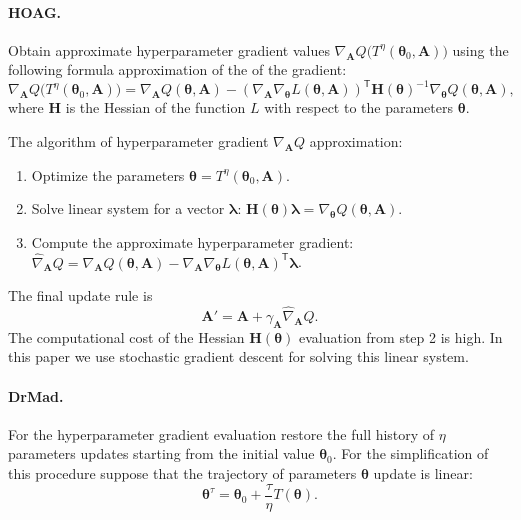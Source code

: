 \documentclass[smallcondensed]{svjour3}
\begin{document}
\paragraph{HOAG.}
Obtain approximate hyperparameter gradient values  $\nabla_{\mathbf{A}} Q \bigl(T^\eta(\boldsymbol{\theta}_0, \mathbf{A})\bigr)$ using the following  formula approximation of the  of the gradient:
\[
\nabla_{\mathbf{A}} Q \bigl(T^\eta(\boldsymbol{\theta}_0, \mathbf{A})\bigr) = \nabla_{\mathbf{A}} Q(\boldsymbol{\theta}, \mathbf{A}) - (\nabla_{ \mathbf{A}}  \nabla_{\boldsymbol{\theta}} L(\boldsymbol{\theta}, \mathbf{A}))^\mathsf{T}\mathbf{H}(\boldsymbol{\theta})^{-1}\nabla_{\boldsymbol{\theta}} Q(\boldsymbol{\theta}, \mathbf{A}),
\]
where $\mathbf{H}$ is the Hessian of the function $L$ with respect to the parameters $\boldsymbol{\theta}$.

The algorithm of hyperparameter gradient $\nabla_{\mathbf{A}} Q$  approximation:
\begin{enumerate}
\item Optimize the parameters $\boldsymbol{\theta} = T^\eta(\boldsymbol{\theta}_0, \mathbf{A})$.
\item Solve linear system for a vector $\boldsymbol{\lambda}$: $\mathbf{H}(\boldsymbol{\theta})\boldsymbol{\lambda} =  \nabla_{\boldsymbol{\theta}} Q(\boldsymbol{\theta}, \mathbf{A})$.
\item Compute the approximate hyperparameter gradient: $\hat{\nabla}_{\mathbf{A}}Q = \nabla_{\mathbf{A}}Q(\boldsymbol{\theta}, \mathbf{A}) - \nabla_{ \mathbf{A}}  \nabla_{\boldsymbol{\theta}} L(\boldsymbol{\theta}, \mathbf{A})^\mathsf{T}\boldsymbol{\lambda}$.
\end{enumerate}

The final update rule is
\begin{equation}
\label{eq:update_hyper}
\mathbf{A}' = \mathbf{A} + \gamma_{\mathbf{A}} \hat{\nabla}_{\mathbf{A}}Q.
\end{equation}
The computational cost of the Hessian $\mathbf{H}(\boldsymbol{\theta})$ evaluation  from step 2 is high.  In this paper we use stochastic gradient descent for solving this linear system. 


\paragraph{DrMad.}
For the hyperparameter gradient evaluation restore the full history of $\eta$ parameters updates starting from the initial value $\boldsymbol{\theta}_0$.  For the simplification of this procedure suppose that the trajectory of parameters $\boldsymbol{\theta}$ update is linear:
\begin{equation}
\label{eq:mad_lin}
\boldsymbol{\theta}^\tau = \boldsymbol{\theta}_0 + \frac{\tau}{\eta} T(\boldsymbol{\theta}).
\end{equation}
\end{document}
